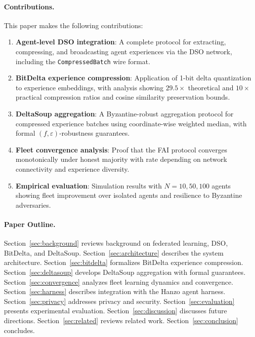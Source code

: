\paragraph{Contributions.}
This paper makes the following contributions:
\begin{enumerate}[leftmargin=1.5em]
    \item \textbf{Agent-level DSO integration}: A complete protocol for
          extracting, compressing, and broadcasting agent experiences via the
          DSO network, including the \texttt{CompressedBatch} wire format.
    \item \textbf{BitDelta experience compression}: Application of 1-bit delta
          quantization to experience embeddings, with analysis showing
          $29.5\times$ theoretical and $10\times$ practical compression ratios
          and cosine similarity preservation bounds.
    \item \textbf{DeltaSoup aggregation}: A Byzantine-robust aggregation
          protocol for compressed experience batches using coordinate-wise
          weighted median, with formal $(f,\varepsilon)$-robustness guarantees.
    \item \textbf{Fleet convergence analysis}: Proof that the FAI protocol
          converges monotonically under honest majority with rate depending on
          network connectivity and experience diversity.
    \item \textbf{Empirical evaluation}: Simulation results with $N=10, 50, 100$
          agents showing fleet improvement over isolated agents and resilience to
          Byzantine adversaries.
\end{enumerate}

\paragraph{Paper Outline.}
Section~\ref{sec:background} reviews background on federated learning, DSO, BitDelta,
and DeltaSoup. Section~\ref{sec:architecture} describes the system architecture.
Section~\ref{sec:bitdelta} formalizes BitDelta experience compression.
Section~\ref{sec:deltasoup} develops DeltaSoup aggregation with formal guarantees.
Section~\ref{sec:convergence} analyzes fleet learning dynamics and convergence.
Section~\ref{sec:harness} describes integration with the Hanzo agent harness.
Section~\ref{sec:privacy} addresses privacy and security.
Section~\ref{sec:evaluation} presents experimental evaluation.
Section~\ref{sec:discussion} discusses future directions.
Section~\ref{sec:related} reviews related work.
Section~\ref{sec:conclusion} concludes.

